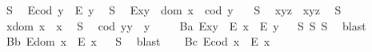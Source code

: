 \begin{isabellebody}
\ S{}{\isacharcolon}\ %
\ {\isachardoublequoteopen}E{\isacharparenleft}cod\ y{\isacharparenright}\ \isactrlbold {\isasymrightarrow}\ E\ y{\isachardoublequoteclose}\ \isanewline
\ S{}{\isacharcolon}\ %
\ {\isachardoublequoteopen}E{\isacharparenleft}x{\isasymcdot}y{\isacharparenright}\ \isactrlbold {\isasymleftrightarrow}\ dom\ x\ {\isasymsimeq}\ cod\ y{\isachardoublequoteclose}\ \ \isanewline
\ S{}{\isacharcolon}\ %
\ {\isachardoublequoteopen}x{\isasymcdot}{\isacharparenleft}y{\isasymcdot}z{\isacharparenright}\ {\isasymcong}\ {\isacharparenleft}x{\isasymcdot}y{\isacharparenright}{\isasymcdot}z{\isachardoublequoteclose}\ \isanewline
\ S{}{\isacharcolon}\ %
\ {\isachardoublequoteopen}x{\isasymcdot}{\isacharparenleft}dom\ x{\isacharparenright}\ {\isasymcong}\ x{\isachardoublequoteclose}\ \isanewline
\ S{}{\isacharcolon}\ %
\ {\isachardoublequoteopen}{\isacharparenleft}cod\ y{\isacharparenright}{\isasymcdot}y\ {\isasymcong}\ y{\isachardoublequoteclose}\ \isanewline
\isanewline
\ \ \isamarkupfalse%
\ B{}a{\isacharcolon}\ {\isachardoublequoteopen}E{\isacharparenleft}x{\isasymcdot}y{\isacharparenright}\ \isactrlbold {\isasymrightarrow}\ {\isacharparenleft}E\ x\ \isactrlbold {\isasymand}\ E\ y{\isacharparenright}{\isachardoublequoteclose}%
\isadelimproof
\ %
\endisadelimproof
%
\isatagproof
{}\isamarkupfalse%
\ S{}\ S{}\ S{}\ \isamarkupfalse%
\ blast%
\endisatagproof
{\isafoldproof}%
%
\isadelimproof
%
\endisadelimproof
\isanewline
\ \ \isamarkupfalse%
\ B{}b{\isacharcolon}\ {\isachardoublequoteopen}E{\isacharparenleft}dom\ x{\isacharparenright}\ \isactrlbold {\isasymrightarrow}\ E\ x{\isachardoublequoteclose}%
\isadelimproof
\ %
\endisadelimproof
%
\isatagproof
{}\isamarkupfalse%
\ S{}\ \isamarkupfalse%
\ blast%
\endisatagproof
{\isafoldproof}%
%
\isadelimproof
%
\endisadelimproof
\isanewline
\ \ \isamarkupfalse%
\ B{}c{\isacharcolon}\ {\isachardoublequoteopen}E{\isacharparenleft}cod\ x{\isacharparenright}\ \isactrlbold {\isasymrightarrow}\ E\ x{\isachardoublequoteclose}%
\isadelimproof
\ %
\endisadelimproof
%
\isatagproof

\end{isabellebody}
